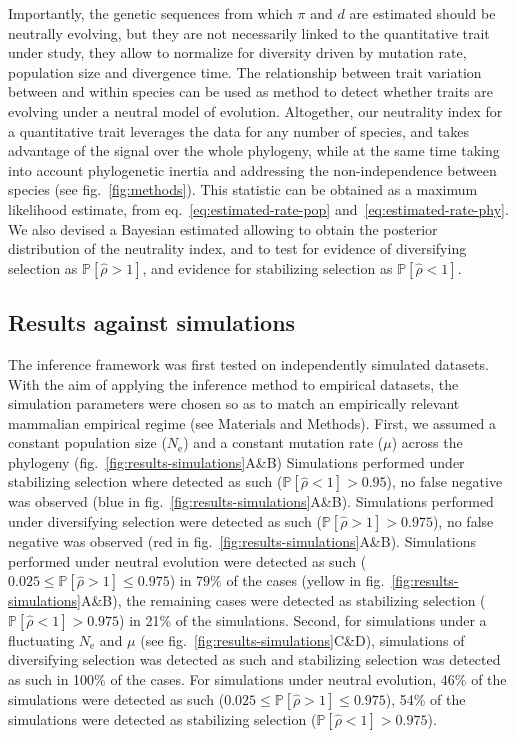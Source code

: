\documentclass{article}
\newcommand{\Ne}{N_{\text{e}}}
\newcommand{\proba}{\mathbb{P}}
\newcommand{\MutationRate}{\mu}
\newcommand{\EstNI}{\widehat{\rho}}
\begin{document}
Importantly, the genetic sequences from which $\pi$ and $d$ are estimated should be neutrally evolving, but they are not necessarily linked to the quantitative trait under study, they allow to normalize for diversity driven by mutation rate, population size and divergence time.
The relationship between trait variation between and within species can be used as method to detect whether traits are evolving under a neutral model of evolution.
Altogether, our neutrality index for a quantitative trait leverages the data for any number of species, and takes advantage of the signal over the whole phylogeny, while at the same time taking into account phylogenetic inertia and addressing the non-independence between species (see fig.~\ref{fig:methods}).
This statistic can be obtained as a maximum likelihood estimate, from eq.~\ref{eq:estimated-rate-pop} and~\ref{eq:estimated-rate-phy}.
We also devised a Bayesian estimated allowing to obtain the posterior distribution of the neutrality index, and to test for evidence of diversifying selection as $\proba [\EstNI > 1]$, and evidence for stabilizing selection as $\proba [\EstNI < 1]$.

\subsection*{Results against simulations}\label{subsec:results-against-simulations}

The inference framework was first tested on independently simulated datasets.
With the aim of applying the inference method to empirical datasets, the simulation parameters were chosen so as to match an empirically relevant mammalian empirical regime (see Materials and Methods).
First, we assumed a constant population size ($\Ne$) and a constant mutation rate ($\MutationRate$) across the phylogeny (fig.~\ref{fig:results-simulations}A\&B)
Simulations performed under stabilizing selection where detected as such ($\proba [\EstNI < 1] > 0.95$), no false negative was observed (blue in fig.~\ref{fig:results-simulations}A\&B).
Simulations performed under diversifying selection were detected as such ($\proba [\EstNI > 1] > 0.975$), no false negative was observed (red in fig.~\ref{fig:results-simulations}A\&B).
Simulations performed under neutral evolution were detected as such ($0.025 \leq \proba [\EstNI > 1] \leq 0.975$) in 79\% of the cases (yellow in fig.~\ref{fig:results-simulations}A\&B), the remaining cases were detected as stabilizing selection ($\proba [\EstNI < 1] > 0.975$) in 21\% of the simulations.
Second, for simulations under a fluctuating $\Ne$ and $\MutationRate$ (see fig.~\ref{fig:results-simulations}C\&D), simulations of diversifying selection was detected as such and stabilizing selection was detected as such in 100\% of the cases.
For simulations under neutral evolution, 46\% of the simulations were detected as such ($0.025 \leq \proba [\EstNI > 1] \leq 0.975$), 54\% of the simulations were detected as stabilizing selection ($\proba [\EstNI < 1] > 0.975$).
\end{document}

